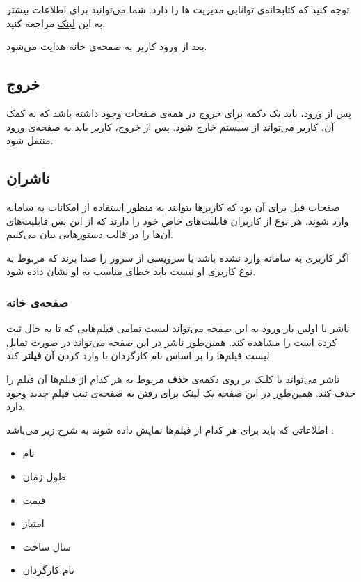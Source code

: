 \documentclass{utap}
\begin{document}
	توجه کنید که کتابخانه‌ی
	 توانایی مدیریت
	  ها
	   را دارد. شما می‌توانید برای اطلاعات بیشتر به این  
	   \href{https://github.com/UTAP/APHTTP/wiki/Session}{لینک}
	   مراجعه کنید. 
	
	بعد از ورود کاربر به صفحه‌ی خانه هدایت می‌شود.

	
	\subsection{خروج}
	پس از ورود، باید یک دکمه برای خروج در همه‌ی صفحات وجود داشته باشد که به کمک آن، کاربر می‌تواند از سیستم خارج شود. پس از خروج، کاربر باید به صفحه‌ی ورود منتقل شود.
	
	
	
	\subsection{ناشران}
	صفحات قبل برای آن بود که کاربر‌ها بتوانند به منظور استفاده از امکانات به سامانه‌ وارد شوند. هر نوع از کاربران قابلیت‌های خاص خود  را دارند که از این پس قابلیت‌های آن‌ها را در قالب دستورهایی بیان می‌کنیم.
	
		اگر کاربری به سامانه وارد نشده باشد یا سرویسی از سرور را صدا بزند که مربوط به نوع کاربری او نیست باید خطای مناسب به او نشان داده شود.
		
		\subsubsection{صفحه‌ی خانه} 
		ناشر با اولین بار ورود به این صفحه می‌تواند لیست تمامی فیلم‌هایی که تا به حال ثبت کرده است را مشاهده کند. همین‌طور ناشر در این صفحه می‌تواند در صورت تمایل لیست‌ فیلم‌ها را بر اساس نام کارگردان با وارد کردن آن \textbf{فیلتر} کند. 
		
		
		ناشر می‌تواند با کلیک بر روی دکمه‌ی \textbf{حذف} مربوط به هر کدام از فیلم‌ها آن فیلم را حذف کند. 
		همین‌طور در این صفحه یک لینک برای رفتن به صفحه‌ی ثبت فیلم جدید وجود دارد.
		
		اطلاعاتی که باید برای هر کدام از فیلم‌ها نمایش داده شوند به شرح زیر می‌باشد :‌
		\begin{multicols}{3}
		\begin{itemize}
			\item نام 
			\item طول زمان  
			\item قیمت 
			\item امتیاز 
			\item سال ساخت
			\item نام کارگردان
		\end{itemize}
		\end{multicols}
		
\end{document}
